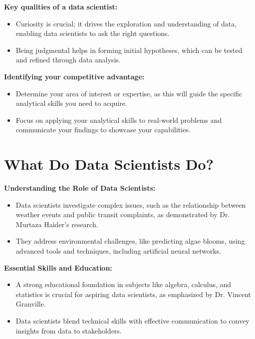 \documentclass[12pt]{report} %
\begin{document}
	\par
	\noindent \textbf{Key qualities of a data scientist:}
	\begin{itemize}
		\item Curiosity is crucial; it drives the exploration and understanding of data, enabling data scientists to ask the right questions.
		\item Being judgmental helps in forming initial hypotheses, which can be tested and refined through data analysis.
	\end{itemize}
	
	
	\noindent \textbf{Identifying your competitive advantage:}
	\begin{itemize}
		\item Determine your area of interest or expertise, as this will guide the specific analytical skills you need to acquire.
		\item Focus on applying your analytical skills to real-world problems and communicate your findings to showcase your capabilities.
	\end{itemize}


	
	\section{What Do Data Scientists Do?}
	
	\noindent \textbf{Understanding the Role of Data Scientists:}
	\begin{itemize}
		\item Data scientists investigate complex issues, such as the relationship between weather events and public transit complaints, as demonstrated by Dr. Murtaza Haider's research.
		\item They address environmental challenges, like predicting algae blooms, using advanced tools and techniques, including artificial neural networks.
	\end{itemize}

	\noindent \textbf{Essential Skills and Education:}
	\begin{itemize}
		\item A strong educational foundation in subjects like algebra, calculus, and statistics is crucial for aspiring data scientists, as emphasized by Dr. Vincent Granville.
		\item Data scientists blend technical skills with effective communication to convey insights from data to stakeholders.
	\end{itemize}
\end{document}
